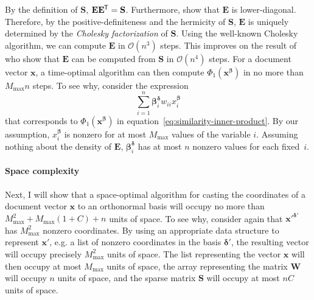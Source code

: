 \documentclass[
  digital, %
  notable, %
  lof,     %
  lot,     %
  nopalatino, color
]{fithesis3}
\let\term\emph
\newcommand*{\tran}{^{\mkern-1.5mu\mathsf{T}}}
\let\emph=\textit
\begin{document}
By the definition of $\mathbf S$, $\mathbf E\mathbf
E\tran=\mathbf S$.
Furthermore, \textcite[sec.~2.5]{sidorov2014soft} show that $\mathbf E$ is
lower-diagonal. Therefore, by the positive-definiteness and the hermicity of $\mathbf S$, $\mathbf E$
 is uniquely determined by the \term{Cholesky
factorization} of $\mathbf S$. Using the well-known Cholesky algorithm, we can
compute $\mathbf E$ in $\mathcal O(n^3)$ steps. This improves on the result of
\textcite[sec.~2.5]{sidorov2014soft} who show that $\mathbf E$ can be computed
from $\mathbf S$ in $\mathcal O(n^4)$ steps. For a document vector
$\mathbf x$, a time-optimal algorithm can then compute $\Phi_1(\mathbf
x^{\bm\beta})$ in no more than $M_{\max}n$ steps. To see why,
consider the expression
\begin{equation*}
  \sum_{i=1}^n \bm{\beta}_i^{\bm\delta}w_{ii}x_i^{\bm\beta}
\end{equation*}
that corresponds to $\Phi_1(\mathbf x^{\bm\beta})$ in
equation~\ref{eq:similarity-inner-product}. By our assumption, $x_i^{\bm\beta}$
is nonzero for at most $M_{\max}$ values of the variable $i$.
Assuming nothing about the density of $\mathbf E$, $\bm\beta_i^{\bm\delta}$
has at most $n$ nonzero values for each fixed~$i$.

\paragraph{Space complexity} Next, I will show that a space-optimal algorithm
for casting the coordinates of a document vector $\mathbf x$ to an orthonormal
basis will occupy no more than $M_{\max}^2+M_{\max}(1+C)+n$
units of space.  To see why, consider again that $\mathbf x'^{\bm\delta'}$ has
$M_{\max}^2$ nonzero coordinates. By using an appropriate data structure to
represent $\mathbf x'$, e.g. a list of nonzero coordinates in the basis
$\bm\delta'$, the resulting vector will occupy precisely $M_{\max}^2$ units of
space. The list representing the vector $\mathbf x$ will then occupy at most
$M_{\max}$ units of space, the array representing the matrix $\mathbf
W$ will occupy $n$ units of space, and the sparse matrix
$\mathbf S$ will occupy at most $nC$ units of space.
\end{document}
